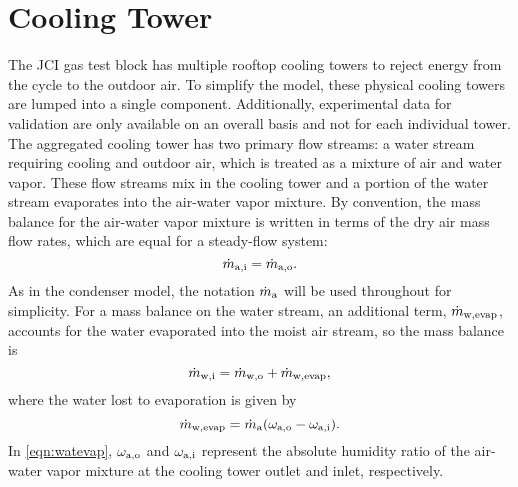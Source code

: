 \section{Cooling Tower} \label{sec:CoolingTower}
The JCI gas test block has multiple rooftop cooling towers to reject
energy from the cycle to the outdoor air.
To simplify the model, these physical cooling towers are lumped into
a single component.
Additionally, experimental data for validation are only available
on an overall basis and not for each individual tower.
The aggregated cooling tower has two primary flow streams: a water stream
requiring cooling and outdoor air, which is treated as a mixture of air and water vapor.
These flow streams mix in the cooling tower and a portion of the water stream
evaporates into the air-water vapor mixture.
By convention, the mass balance for the air-water vapor mixture
is written in terms of the dry air mass flow rates, which are equal 
for a steady-flow system:
\begin{equation}
  \dot{m}_{\text{a},\text{i}} = \dot{m}_{\text{a},\text{o}}.
\end{equation}
As in the condenser model, the notation $\dot{m}_{\text{a}}$ will be used throughout
for simplicity.
For a mass balance on the water stream, an additional term, $\dot{m}_{\text{w},\text{evap}}$, accounts for
the water evaporated into the moist air stream,
so the mass balance is
\begin{equation}
  \dot{m}_{\text{w},\text{i}} = \dot{m}_{\text{w},\text{o}} + \dot{m}_{\text{w},\text{evap}},
\end{equation}
where the water lost to evaporation is given by
\begin{equation}
  \dot{m}_{\text{w},\text{evap}} = \dot{m}_{\text{a}} (\omega_{\text{a},\text{o}} - \omega_{\text{a},\text{i}}).
  \label{eqn:watevap}
\end{equation}
In \cref{eqn:watevap}, $\omega_{\text{a},\text{o}}$ and $\omega_{\text{a},\text{i}}$ 
represent the absolute humidity ratio of the 
air-water vapor mixture at the cooling tower outlet and inlet, respectively.

